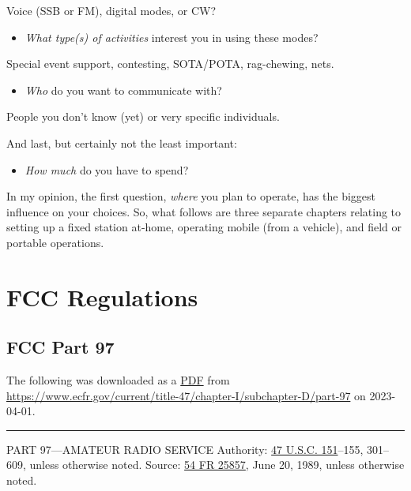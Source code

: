 \documentclass[
  letterpaper,
  DIV=11,
  numbers=noendperiod]{scrreport}
\providecommand{\tightlist}{%
  \setlength{\itemsep}{0pt}\setlength{\parskip}{0pt}}\usepackage{longtable,booktabs,array}
\begin{document}
Voice (SSB or FM), digital modes, or CW?

\begin{itemize}
\tightlist
\item
  \emph{What type(s) of activities} interest you in using these modes?
\end{itemize}

Special event support, contesting, SOTA/POTA, rag-chewing, nets.

\begin{itemize}
\tightlist
\item
  \emph{Who} do you want to communicate with?
\end{itemize}

People you don't know (yet) or very specific individuals.

And last, but certainly not the least important:

\begin{itemize}
\tightlist
\item
  \emph{How much} do you have to spend?
\end{itemize}

In my opinion, the first question, \emph{where} you plan to operate, has
the biggest influence on your choices. So, what follows are three
separate chapters relating to setting up a fixed station at-home,
operating mobile (from a vehicle), and field or portable operations.

\part{FCC Regulations}

\hypertarget{part-97}{%
\chapter{FCC Part 97}\label{part-97}}

The following was downloaded as a
\href{include/pdf/47\%20CFR\%20Part\%2097\%20(up\%20to\%20date\%20as\%20of\%203-30-2023).pdf}{PDF}
from
\url{https://www.ecfr.gov/current/title-47/chapter-I/subchapter-D/part-97}
on 2023-04-01.

\begin{center}\rule{0.5\linewidth}{0.5pt}\end{center}

PART 97---AMATEUR RADIO SERVICE Authority:
\href{https://www.govinfo.gov/link/uscode/47/151}{47 U.S.C. 151}--155,
301--609, unless otherwise noted. Source:
\href{https://www.federalregister.gov/citation/54-FR-25857}{54 FR
25857}, June 20, 1989, unless otherwise noted.
\end{document}
